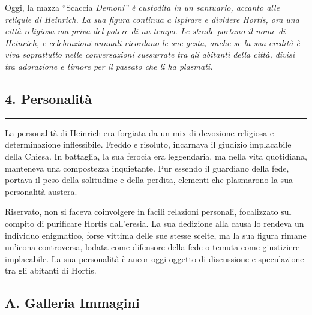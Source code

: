 Oggi, la mazza ``Scaccia \emph{Demoni'' è custodita in un santuario,
accanto alle reliquie di Heinrich. La sua figura continua a ispirare e
dividere Hortis, ora una città religiosa ma priva del potere di un
tempo. Le strade portano il nome di Heinrich, e celebrazioni annuali
ricordano le sue gesta, anche se la sua eredità è viva soprattutto nelle
conversazioni sussurrate tra gli abitanti della città, divisi tra
adorazione e timore per il passato che li ha plasmati.}

\subsection{4. Personalità}\label{personalituxe0}

\begin{center}\rule{0.5\linewidth}{0.5pt}\end{center}

La personalità di Heinrich era forgiata da un mix di devozione religiosa
e determinazione inflessibile. Freddo e risoluto, incarnava il giudizio
implacabile della Chiesa. In battaglia, la sua ferocia era leggendaria,
ma nella vita quotidiana, manteneva una compostezza inquietante. Pur
essendo il guardiano della fede, portava il peso della solitudine e
della perdita, elementi che plasmarono la sua personalità austera.

Riservato, non si faceva coinvolgere in facili relazioni personali,
focalizzato sul compito di purificare Hortis dall'eresia. La sua
dedizione alla causa lo rendeva un individuo enigmatico, forse vittima
delle sue stesse scelte, ma la sua figura rimane un'icona controversa,
lodata come difensore della fede o temuta come giustiziere implacabile.
La sua personalità è ancor oggi oggetto di discussione e speculazione
tra gli abitanti di Hortis.

\subsection{A. Galleria Immagini}\label{a.-galleria-immagini}

